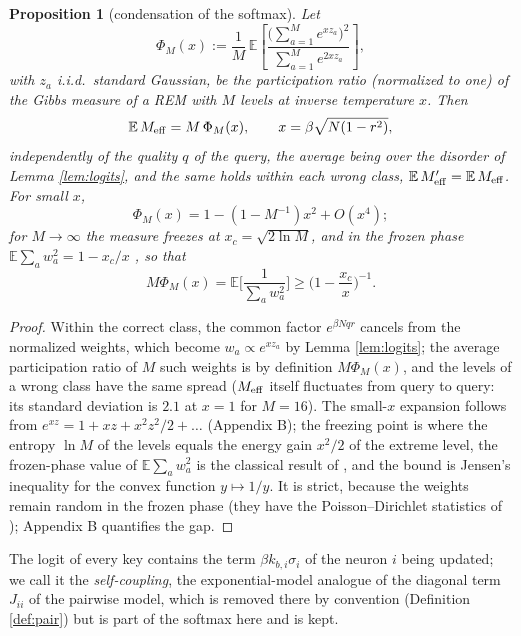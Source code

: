 \documentclass{SciPost}
\theoremstyle{plain}
\newtheorem{proposition}{Proposition}
\theoremstyle{definition}
\newcommand{\E}{\mathbb{E}}
\newcommand{\Meff}{M_{\rm eff}}
\begin{document}
\begin{proposition}[condensation of the softmax]\label{prop:rem}
Let
\begin{equation*}
\Phi_M(x):=\frac1M\,\E\!\left[\frac{\big(\sum_{a=1}^Me^{xz_a}\big)^2}{\sum_{a=1}^Me^{2xz_a}}\right],
\end{equation*}
with $z_a$ i.i.d.\ standard Gaussian, be the participation ratio (normalized to one) of the Gibbs measure of a REM with $M$ levels at inverse temperature $x$. Then
\begin{equation}
\E\,\Meff=M\,\Phi_M(x),\qquad x=\beta\sqrt{N(1-r^2)},
\label{eq:Meff}
\end{equation}
independently of the quality $q$ of the query, the average being over the disorder of Lemma \ref{lem:logits}, and the same holds within each wrong class, $\E\,\Meff'=\E\,\Meff$. For small $x$,
\begin{equation*}
\Phi_M(x)=1-(1-M^{-1})x^2+O(x^4);
\end{equation*}
for $M\to\infty$ the measure freezes at $x_c=\sqrt{2\ln M}$, and in the frozen phase $\E\sum_aw_a^2=1-x_c/x$ \cite{Derrida1980,Derrida1981,Derrida1985b,MPV1985}, so that
\begin{equation*}
M\Phi_M(x)=\E\Big[\frac{1}{\sum_aw_a^2}\Big]\ge\Big(1-\frac{x_c}{x}\Big)^{-1}.
\end{equation*}
\end{proposition}
\begin{proof}
Within the correct class, the common factor $e^{\beta Nqr}$ cancels from the normalized weights, which become $w_a\propto e^{xz_a}$ by Lemma \ref{lem:logits}; the average participation ratio of $M$ such weights is by definition $M\Phi_M(x)$, and the levels of a wrong class have the same spread ($\Meff$ itself fluctuates from query to query: its standard deviation is $2.1$ at $x=1$ for $M=16$). The small-$x$ expansion follows from $e^{xz}=1+xz+x^2z^2/2+\dots$ (Appendix B); the freezing point is where the entropy $\ln M$ of the levels equals the energy gain $x^2/2$ of the extreme level, the frozen-phase value of $\E\sum_aw_a^2$ is the classical result of \cite{Derrida1985b,MPV1985}, and the bound is Jensen's inequality for the convex function $y\mapsto1/y$. It is strict, because the weights remain random in the frozen phase (they have the Poisson--Dirichlet statistics of \cite{MPV1985}); Appendix B quantifies the gap.
\end{proof}

The logit of every key contains the term $\beta k_{b,i}\sigma_i$ of the neuron $i$ being updated; we call it the \emph{self-coupling}, the exponential-model analogue of the diagonal term $J_{ii}$ of the pairwise model, which is removed there by convention (Definition \ref{def:pair}) but is part of the softmax here and is kept.
\end{document}
